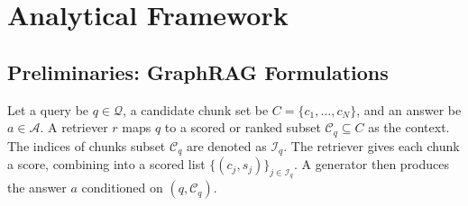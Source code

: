 \documentclass{article}
\theoremstyle{plain}
\theoremstyle{definition}
\theoremstyle{remark}
\begin{document}









\section{Analytical Framework}

\subsection{Preliminaries: GraphRAG Formulations}
Let a query be $q\in\mathcal{Q}$, a candidate chunk set be $C=\{c_1,\dots,c_N\}$, and an answer be $a\in\mathcal{A}$. A retriever $r$ maps $q$ to a scored or ranked subset $\mathcal{C}_q\subseteq C$ as the context.
The indices of chunks subset $\mathcal{C}_q$ are denoted as $\mathcal{I}_q$. 
The retriever gives each chunk a score, combining into a scored list $\{(c_j,s_j)\}_{j\in\mathcal{I}_q}$. 
A generator then produces the answer $a$ conditioned on $(q,\mathcal{C}_q)$. 


\end{document}
